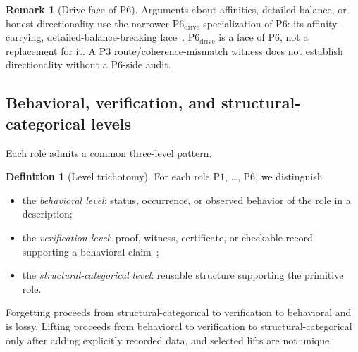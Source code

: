\documentclass[11pt]{article}
\theoremstyle{definition}
\newtheorem{definition}[theorem]{Definition}
\newtheorem{remark}[theorem]{Remark}
\newcommand{\Pone}{\ensuremath{\mathrm{P1}}}
\newcommand{\Pthree}{\ensuremath{\mathrm{P3}}}
\newcommand{\Psix}{\ensuremath{\mathrm{P6}}}
\begin{document}
\begin{remark}[Drive face of \Psix{}]\label{rem:p6-drive}
Arguments about affinities, detailed balance, or honest directionality
use the narrower \(\mathrm{P6}_{\mathrm{drive}}\) specialization of
\Psix{}: its affinity-carrying, detailed-balance-breaking
face~\citep{Seifert2012}. \(\mathrm{P6}_{\mathrm{drive}}\) is a face
of \Psix{}, not a replacement for it. A \Pthree{}
route/coherence-mismatch witness does not establish directionality
without a \Psix{}-side audit.
\end{remark}

\subsection{Behavioral, verification, and structural-categorical levels}\label{subsec:levels}

Each role admits a common three-level pattern.

\begin{definition}[Level trichotomy]\label{def:level-trichotomy}
For each role \Pone{}, \ldots, \Psix{}, we distinguish
\begin{itemize}[topsep=2pt,itemsep=1pt]
  \item the \emph{behavioral level}: status, occurrence, or observed
    behavior of the role in a description;
  \item the \emph{verification level}: proof, witness, certificate, or
    checkable record supporting a behavioral
    claim~\citep{MartinLof1984};
  \item the \emph{structural-categorical level}: reusable structure
    supporting the primitive role.
\end{itemize}
Forgetting proceeds from structural-categorical to verification to
behavioral and is lossy. Lifting proceeds from behavioral to
verification to structural-categorical only after adding explicitly
recorded data, and selected lifts are not unique.
\end{definition}
\end{document}
